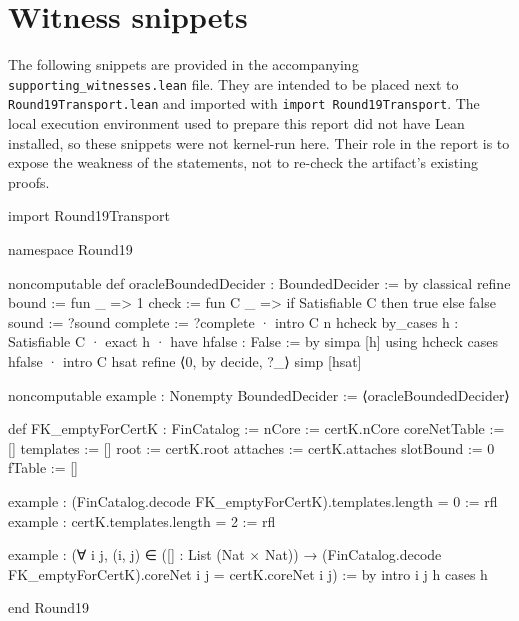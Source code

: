 \documentclass[11pt]{article}
\begin{document}
\appendix
\section{Witness snippets}

The following snippets are provided in the accompanying \texttt{supporting\_witnesses.lean} file. They are intended to be placed next to \texttt{Round19Transport.lean} and imported with \texttt{import Round19Transport}. The local execution environment used to prepare this report did not have Lean installed, so these snippets were not kernel-run here. Their role in the report is to expose the weakness of the statements, not to re-check the artifact's existing proofs.

\begin{leancode}
import Round19Transport

namespace Round19

noncomputable def oracleBoundedDecider : BoundedDecider := by
  classical
  refine
    { bound := fun _ => 1
      check := fun C _ => if Satisfiable C then true else false
      sound := ?sound
      complete := ?complete }
  · intro C n hcheck
    by_cases h : Satisfiable C
    · exact h
    · have hfalse : False := by simpa [h] using hcheck
      cases hfalse
  · intro C hsat
    refine ⟨0, by decide, ?_⟩
    simp [hsat]

noncomputable example : Nonempty BoundedDecider :=
  ⟨oracleBoundedDecider⟩

def FK_emptyForCertK : FinCatalog :=
  { nCore := certK.nCore
    coreNetTable := []
    templates := []
    root := certK.root
    attaches := certK.attaches
    slotBound := 0
    fTable := [] }

example : (FinCatalog.decode FK_emptyForCertK).templates.length = 0 := rfl
example : certK.templates.length = 2 := rfl

example :
    (∀ i j, (i, j) ∈ ([] : List (Nat × Nat)) →
      (FinCatalog.decode FK_emptyForCertK).coreNet i j = certK.coreNet i j) := by
  intro i j h
  cases h

end Round19
\end{leancode}
\end{document}
